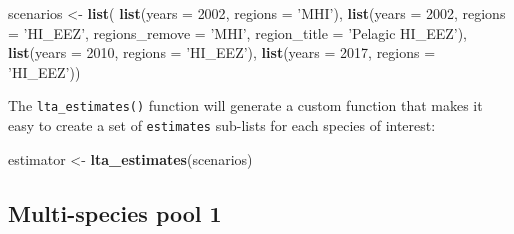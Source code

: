 \documentclass[
]{book}
\newenvironment{Shaded}{\begin{snugshade}}{\end{snugshade}}
\newcommand{\DataTypeTok}[1]{\textcolor[rgb]{0.13,0.29,0.53}{#1}}
\newcommand{\DecValTok}[1]{\textcolor[rgb]{0.00,0.00,0.81}{#1}}
\newcommand{\KeywordTok}[1]{\textcolor[rgb]{0.13,0.29,0.53}{\textbf{#1}}}
\newcommand{\NormalTok}[1]{#1}
\newcommand{\StringTok}[1]{\textcolor[rgb]{0.31,0.60,0.02}{#1}}
\begin{document}
\begin{Shaded}
\begin{Highlighting}[]
\NormalTok{scenarios <-}\StringTok{ }\KeywordTok{list}\NormalTok{(}
    \KeywordTok{list}\NormalTok{(}\DataTypeTok{years =} \DecValTok{2002}\NormalTok{,}
       \DataTypeTok{regions =} \StringTok{'MHI'}\NormalTok{),}
    \KeywordTok{list}\NormalTok{(}\DataTypeTok{years =} \DecValTok{2002}\NormalTok{, }
         \DataTypeTok{regions =} \StringTok{'HI_EEZ'}\NormalTok{,}
         \DataTypeTok{regions_remove =} \StringTok{'MHI'}\NormalTok{,}
         \DataTypeTok{region_title =} \StringTok{'Pelagic HI_EEZ'}\NormalTok{),}
    \KeywordTok{list}\NormalTok{(}\DataTypeTok{years =} \DecValTok{2010}\NormalTok{,}
         \DataTypeTok{regions =} \StringTok{'HI_EEZ'}\NormalTok{),}
    \KeywordTok{list}\NormalTok{(}\DataTypeTok{years =} \DecValTok{2017}\NormalTok{,}
         \DataTypeTok{regions =} \StringTok{'HI_EEZ'}\NormalTok{))}
\end{Highlighting}
\end{Shaded}

The \texttt{lta\_estimates()} function will generate a custom function that makes it easy to create a set of \texttt{estimates} sub-lists for each species of interest:

\begin{Shaded}
\begin{Highlighting}[]
\NormalTok{estimator <-}\StringTok{ }\KeywordTok{lta_estimates}\NormalTok{(scenarios)}
\end{Highlighting}
\end{Shaded}

\hypertarget{multi-species-pool-1-1}{%
\subsection*{Multi-species pool 1}\label{multi-species-pool-1-1}}
\end{document}
